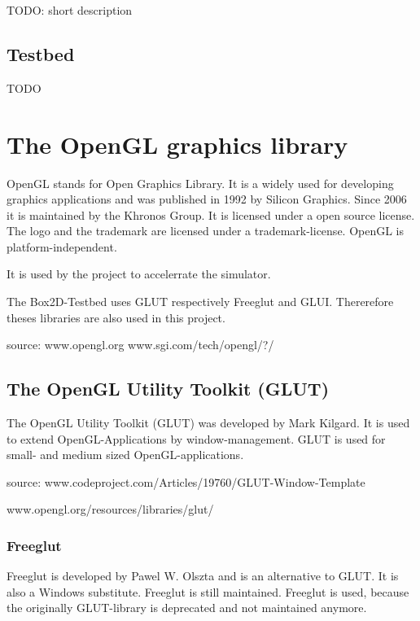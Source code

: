 \documentclass[10pt,a4paper,DIV=11]{scrreprt}
\begin{document}
TODO: short description



\section{Testbed}

TODO


\chapter{The OpenGL graphics library}
OpenGL stands for Open Graphics Library. It is a widely used for developing graphics applications and was published in 1992 by Silicon Graphics. Since 2006 it is maintained by the Khronos Group. It is licensed under a open source license. The logo and the trademark are licensed under a trademark-license.
OpenGL is platform-independent.


It is used by the project to accelerrate the simulator.

The Box2D-Testbed uses GLUT respectively Freeglut and GLUI. Thererefore theses libraries are also used in this project.

source: www.opengl.org
www.sgi.com/tech/opengl/?/


\section{The OpenGL Utility Toolkit (GLUT)}
The OpenGL Utility Toolkit (GLUT) was developed by Mark Kilgard. It is used to extend OpenGL-Applications by window-management. GLUT is used for small- and medium sized OpenGL-applications.

source: www.codeproject.com/Articles/19760/GLUT-Window-Template

www.opengl.org/resources/libraries/glut/

\subsection{Freeglut}
Freeglut is developed by Pawel W. Olszta and is an alternative to GLUT. It is also a Windows substitute. Freeglut is still maintained. Freeglut is used, because the originally GLUT-library is deprecated and not maintained anymore.
\end{document}
